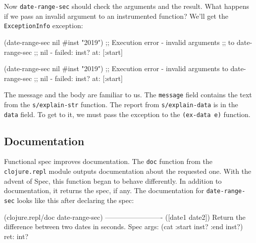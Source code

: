 Now \verb|date-range-sec| should check the arguments and the result. What happens if we pass an invalid argument to an instrumented function? We'll get the \verb|ExceptionInfo| exception:

\ifx\DEVICETYPE\MOBILE

\begin{english}
  \begin{clojure}
(date-range-sec nil #inst "2019")
;; Execution error - invalid arguments
;; to date-range-sec
;; nil - failed: inst? at: [:start]
  \end{clojure}
\end{english}

\else

\begin{english}
  \begin{clojure}
(date-range-sec nil #inst "2019")
;; Execution error - invalid arguments to date-range-sec
;; nil - failed: inst? at: [:start]
  \end{clojure}
\end{english}

\fi


The message and the body are familiar to us. The \verb|message| field contains the text from the \verb|s/explain-str| function. The report from \verb|s/explain-data| is in the \verb|data| field. To get to it, we must pass the exception to the \verb|(ex-data e)| function.

\subsection{Documentation}


Functional spec improves documentation. The \verb|doc| function from the \verb|clojure.repl| module outputs documentation about the requested one. With the advent of Spec, this function began to behave differently. In addition to documentation, it returns the spec, if any. The documentation for \verb|date-range-sec| looks like this after declaring the spec:

\ifx\DEVICETYPE\MOBILE

\begin{english}
  \begin{clojure}
(clojure.repl/doc date-range-sec)
-------------------------
([date1 date2])
  Return the difference
            between two dates in seconds.
Spec
  args: (cat :start inst? :end inst?)
  ret: int?
  \end{clojure}
\end{english}

